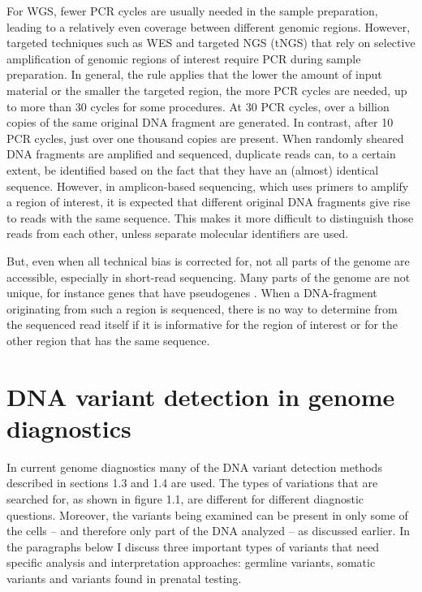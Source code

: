 For WGS, fewer PCR cycles are usually needed in the sample preparation, leading to a relatively even coverage between different genomic regions. 
However, targeted techniques such as WES and targeted NGS (tNGS) that rely on selective amplification of genomic regions of interest require PCR during sample preparation. 
In general, the rule applies that the lower the amount of input material or the smaller the targeted region, the more PCR cycles are needed, up to more than 30 cycles for some procedures. 
At 30 PCR cycles, over a billion copies of the same original DNA fragment are generated. 
In contrast, after 10 PCR cycles, just over one thousand copies are present. 
When randomly sheared DNA fragments are amplified and sequenced, duplicate reads can, to a certain extent, be identified based on the fact that they have an (almost) identical sequence. 
However, in amplicon-based sequencing, which uses primers to amplify a region of interest, it is expected that different original DNA fragments give rise to reads with the same sequence. 
This makes it more difficult to distinguish those reads from each other, unless separate molecular identifiers are used. 

But, even when all technical bias is corrected for, not all parts of the genome are accessible, especially in short-read sequencing. 
Many parts of the genome are not unique, for instance genes that have pseudogenes \cite{Mandelker_2016}. 
When a DNA-fragment originating from such a region is sequenced, there is no way to determine from the sequenced read itself if it is informative for the region of interest or for the other region that has the same sequence. 


\section{DNA variant detection in genome diagnostics} \label{intro_diagnostics}
In current genome diagnostics many of the DNA variant detection methods described in sections 1.3 and 1.4 are used. 
The types of variations that are searched for, as shown in figure 1.1, are different for different diagnostic questions. 
Moreover, the variants being examined can be present in only some of the cells – and therefore only part of the DNA analyzed – as discussed earlier. 
In the paragraphs below I discuss three important types of variants that need specific analysis and interpretation approaches: germline variants, somatic variants and variants found in prenatal testing. 

